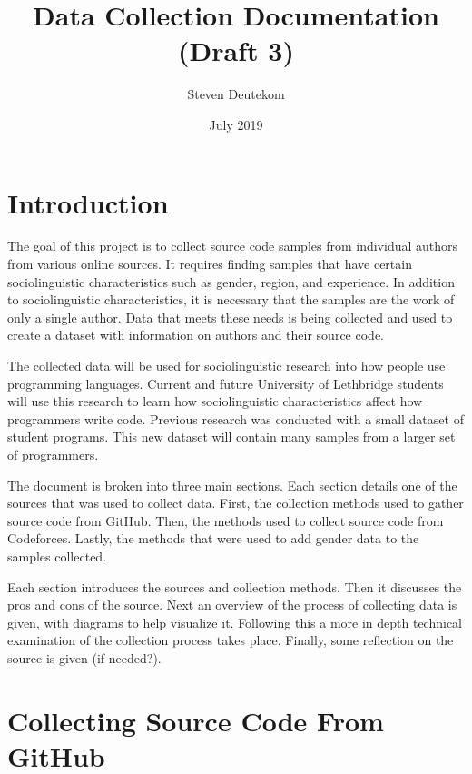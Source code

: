 \documentclass{article}
\begin{document}
\title{Data Collection Documentation (Draft 3)}
\author{Steven Deutekom}
\date{July 2019}
\maketitle


\newpage
\tableofcontents


\newpage
\section{Introduction}
The goal of this project is to collect source code samples from individual authors from various online sources. It requires finding samples that have certain sociolinguistic characteristics such as gender, region, and experience. In addition to sociolinguistic characteristics, it is necessary that the samples are the work of only a single author. Data that meets these needs is being collected and used to create a dataset with information on authors and their source code.

The collected data will be used for sociolinguistic research into how people use programming languages. Current and future University of Lethbridge students will use this research to learn how sociolinguistic characteristics affect how programmers write code. Previous research was conducted with a small dataset of student programs. This new dataset will contain many samples from a larger set of programmers.

The document is broken into three main sections. Each section details one of the sources that was used to collect data. First, the collection methods used to gather source code from GitHub. Then, the methods used to collect source code from Codeforces. Lastly, the methods that were used to add gender data to the samples collected.

Each section introduces the sources and collection methods. Then it discusses the pros and cons of the source. Next an overview of the process of collecting data is given, with diagrams to help visualize it. Following this a more in depth technical examination of the collection process takes place. Finally, some reflection on the source is given (if needed?).


\section{Collecting Source Code From GitHub}
\end{document}
